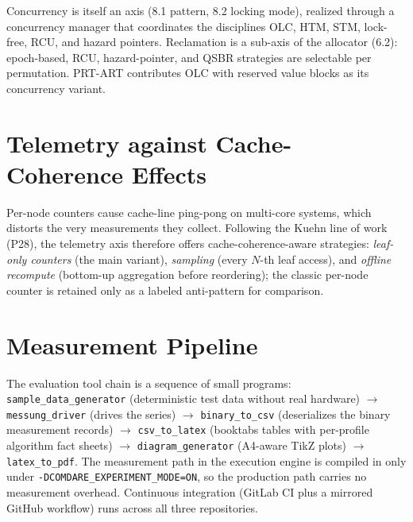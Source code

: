 Concurrency is itself an axis (8.1 pattern, 8.2 locking mode), realized through a
concurrency manager that coordinates the disciplines OLC, HTM, STM, lock-free, RCU, and
hazard pointers. Reclamation is a sub-axis of the allocator (6.2): epoch-based, RCU,
hazard-pointer, and QSBR strategies are selectable per permutation. PRT-ART contributes
OLC with reserved value blocks as its concurrency variant.

\section{Telemetry against Cache-Coherence Effects}\label{sec:telemetry}

Per-node counters cause cache-line ping-pong on multi-core systems, which distorts the
very measurements they collect. Following the Kuehn line of work (P28), the telemetry axis
therefore offers cache-coherence-aware strategies: \emph{leaf-only counters} (the main
variant), \emph{sampling} (every $N$-th leaf access), and \emph{offline recompute}
(bottom-up aggregation before reordering); the classic per-node counter is retained only
as a labeled anti-pattern for comparison.

\section{Measurement Pipeline}\label{sec:pipeline}

The evaluation tool chain is a sequence of small programs:
\texttt{sample\_data\_generator} (deterministic test data without real hardware)
$\rightarrow$ \texttt{messung\_driver} (drives the series) $\rightarrow$
\texttt{binary\_to\_csv} (deserializes the binary measurement records) $\rightarrow$
\texttt{csv\_to\_latex} (booktabs tables with per-profile algorithm fact sheets)
$\rightarrow$ \texttt{diagram\_generator} (A4-aware TikZ plots) $\rightarrow$
\texttt{latex\_to\_pdf}. The measurement path in the execution engine is compiled in only
under \texttt{-DCOMDARE\_EXPERIMENT\_MODE=ON}, so the production path carries no measurement
overhead. Continuous integration (GitLab CI plus a mirrored GitHub workflow) runs across
all three repositories.
